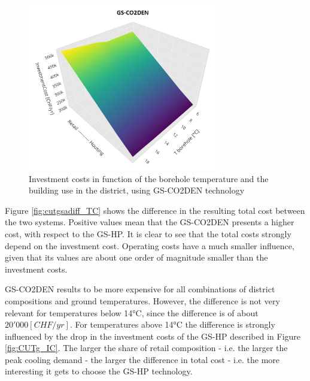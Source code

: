 \documentclass{article}
\begin{document}
\begin{figure}[htp]
	\centering
	\includegraphics[width=0.75\textwidth]{CUTg_SA_CO2_IC.png}
	\caption{Investment costs in function of the borehole temperature and the building use in the district, using GS-CO2DEN technology}
	\label{fig:CUTg_CO2_IC}
\end{figure}

%
%

Figure \ref{fig:cutgsadiff_TC} shows the difference in the resulting total cost between the two systems. Positive values mean that the GS-CO2DEN presents a higher cost, with respect to the GS-HP. It is clear to see that the total costs strongly depend on the investment cost. Operating costs have a much smaller influence, given that its values are about one order of magnitude smaller than the investment costs.

GS-CO2DEN results to be more expensive for all combinations of district compositions and ground temperatures. However, the difference is not very relevant for temperatures below 14\si{\celsius}, since the difference is of about $20'000[CHF/yr]$. For temperatures above 14\si{\celsius} the difference is strongly influenced by the drop in the investment costs of the GS-HP described in Figure \ref{fig:CUTg_IC}. The larger the share of retail composition - i.e. the larger the peak cooling demand - the larger the difference in total cost - i.e. the more interesting it gets to choose the GS-HP technology.\\
\end{document}
